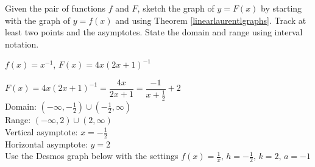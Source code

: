 \documentclass{ximera}
\begin{document}
\begin{problem}
Given the pair of functions $f$ and $F$, sketch the graph of $y=F(x)$ by starting with the graph of $y = f(x)$ and using Theorem \ref{linearlaurentlgraphs}.  Track at least two points and the asymptotes.  State the domain and range using interval notation.

$f(x) =x^{-1}$, $F(x)=4x(2x+1)^{-1}$

\begin{solution}
$F(x)=4x(2x+1)^{-1} = \dfrac{4x}{2x+1} = \dfrac{-1}{x+\frac{1}{2}}+2$ \\
Domain: $\left(-\infty, -\frac{1}{2} \right) \cup \left(-\frac{1}{2},  \infty \right)$ \\
Range: $(-\infty, 2) \cup (2, \infty)$ \\
Vertical asymptote:  $x  = -\frac{1}{2}$ \\
Horizontal asymptote: $y= 2$\\

Use the Desmos graph below with the settings $f(x)=\frac{1}{x},\,h=-\frac{1}{2},\,k=2,\,a=-1$

\begin{center} 
\end{center}




\end{solution}
\end{problem} 
\end{document}
